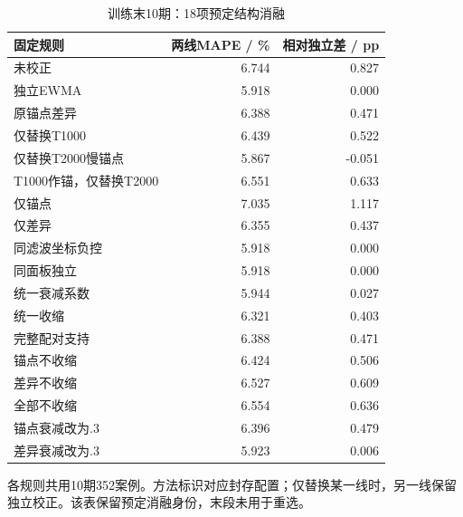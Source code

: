 \begin{table}[!htbp]\centering
\caption{训练末10期：18项预定结构消融}\label{tab:round2ablations}
\small\setlength{\tabcolsep}{4pt}
\begin{tabularx}{\linewidth}{L r r}\toprule
固定规则 & 两线MAPE / \% & 相对独立差 / pp \\
\midrule
未校正 & 6.744 & 0.827 \\
独立EWMA & 5.918 & 0.000 \\
原锚点差异 & 6.388 & 0.471 \\
仅替换T1000 & 6.439 & 0.522 \\
仅替换T2000慢锚点 & 5.867 & -0.051 \\
T1000作锚，仅替换T2000 & 6.551 & 0.633 \\
仅锚点 & 7.035 & 1.117 \\
仅差异 & 6.355 & 0.437 \\
同滤波坐标负控 & 5.918 & 0.000 \\
同面板独立 & 5.918 & 0.000 \\
统一衰减系数 & 5.944 & 0.027 \\
统一收缩 & 6.321 & 0.403 \\
完整配对支持 & 6.388 & 0.471 \\
锚点不收缩 & 6.424 & 0.506 \\
差异不收缩 & 6.527 & 0.609 \\
全部不收缩 & 6.554 & 0.636 \\
锚点衰减改为.3 & 6.396 & 0.479 \\
差异衰减改为.3 & 5.923 & 0.006 \\
\bottomrule\end{tabularx}
\par\vspace{3pt}\begin{minipage}{\linewidth}\footnotesize 各规则共用10期352案例。方法标识对应封存配置；仅替换某一线时，另一线保留独立校正。该表保留预定消融身份，末段未用于重选。\end{minipage}
\end{table}
